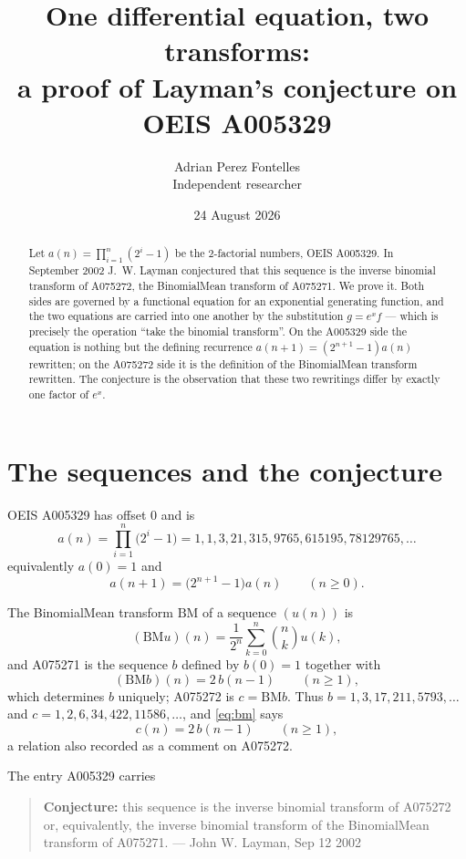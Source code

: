 \documentclass[11pt,a4paper]{article}
\title{One differential equation, two transforms:\\
a proof of Layman's conjecture on OEIS A005329}
\author{Adrian Perez Fontelles\\ \small Independent researcher}
\date{24 August 2026}
\theoremstyle{plain}
\theoremstyle{definition}
\begin{document}
\maketitle

\begin{abstract}
Let $a(n)=\prod_{i=1}^{n}(2^{i}-1)$ be the 2-factorial numbers, OEIS A005329. In September
2002 J.~W. Layman conjectured that this sequence is the inverse binomial transform of
A075272, the BinomialMean transform of A075271. We prove it. Both sides are governed by a
functional equation for an exponential generating function, and the two equations are
carried into one another by the substitution $g=e^{x}f$ --- which is precisely the
operation ``take the binomial transform''. On the A005329 side the equation is nothing but
the defining recurrence $a(n+1)=(2^{n+1}-1)a(n)$ rewritten; on the A075272 side it is the
definition of the BinomialMean transform rewritten. The conjecture is the observation that
these two rewritings differ by exactly one factor of $e^{x}$.
\end{abstract}

\section{The sequences and the conjecture}

OEIS A005329 has offset 0 and is
\[
  a(n)=\prod_{i=1}^{n}\bigl(2^{i}-1\bigr)=1,1,3,21,315,9765,615195,78129765,\dots
\]
equivalently $a(0)=1$ and
\begin{equation}\label{eq:rec}
  a(n+1)=\bigl(2^{n+1}-1\bigr)a(n)\qquad(n\ge0).
\end{equation}

The BinomialMean transform $\mathrm{BM}$ of a sequence $(u(n))$ is
\[
  (\mathrm{BM}u)(n)=\frac{1}{2^{n}}\sum_{k=0}^{n}\binom{n}{k}u(k),
\]
and A075271 is the sequence $b$ defined by $b(0)=1$ together with
\begin{equation}\label{eq:bm}
  (\mathrm{BM}b)(n)=2\,b(n-1)\qquad(n\ge1),
\end{equation}
which determines $b$ uniquely; A075272 is $c=\mathrm{BM}b$. Thus $b=1,3,17,211,5793,\dots$
and $c=1,2,6,34,422,11586,\dots$, and \eqref{eq:bm} says
\begin{equation}\label{eq:shift}
  c(n)=2\,b(n-1)\qquad(n\ge1),
\end{equation}
a relation also recorded as a comment on A075272.

The entry A005329 carries

\begin{quote}
\textbf{Conjecture:} this sequence is the inverse binomial transform of A075272 or,
equivalently, the inverse binomial transform of the BinomialMean transform of A075271. ---
John W. Layman, Sep 12 2002
\end{quote}
\end{document}
